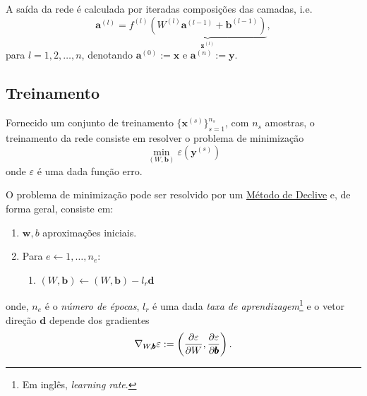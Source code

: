 A saída da rede é calculada por iteradas composições das camadas, i.e.
\begin{equation}
  \pmb{a}^{(l)} = f^{(l)}\underbrace{\left(W^{(l)}\pmb{a}^{(l-1)} + \pmb{b}^{(l-1)}\right)}_{\pmb{z}^{(l)}},
\end{equation}
para $l= 1, 2, \dotsc, n$, denotando $\pmb{a}^{(0)} := \pmb{x}$ e $\pmb{a}^{(n)} := \pmb{y}$.

\subsection{Treinamento}

Fornecido um conjunto de treinamento $\{\pmb{x}^{(s)}\}_{s=1}^{n_s}$, com $n_s$ amostras, o treinamento da rede consiste em resolver o problema de minimização
\begin{equation}
  \min_{(W,\pmb{b})}\varepsilon\left(\pmb{y}^{(s)}\right)
\end{equation}
onde $\varepsilon$ é uma dada função erro.

O problema de minimização pode ser resolvido por um \href{https://notaspedrok.com.br/notas/MatematicaNumericaAvancada/cap\_otimizacao_sec_minimi.html}{Método de Declive} e, de forma geral, consiste em:
\begin{enumerate}
\item $\pmb{w}, b$ aproximações iniciais.
\item Para $e\leftarrow 1, \dotsc, n_e$:
  \begin{enumerate}
  \item $\displaystyle (W, \pmb{b}) \leftarrow (W, \pmb{b}) - l_r\pmb{d}$
  \end{enumerate}
\end{enumerate}
onde, $n_e$ é o \emph{número de épocas}, $l_r$ é uma dada \emph{taxa de aprendizagem}\footnote{Em inglês, {\it learning rate}.} e o vetor direção $\pmb{d}$ depende dos gradientes
\begin{equation}
  \nabla_{W,\pmb{b}} \varepsilon := \left(\frac{\partial\varepsilon}{\partial W}, \frac{\partial\varepsilon}{\partial\pmb{b}}\right).
\end{equation}

